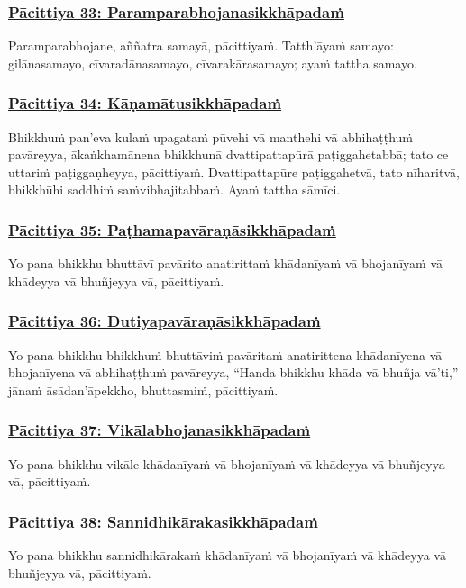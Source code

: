 \subsubsection*{\hyperref[exp33]{Pācittiya 33: Paramparabhojanasikkhāpadaṁ}}
\label{pac33}
Paramparabhojane, aññatra samayā, pācittiyaṁ. Tatth'āyaṁ samayo: gilānasamayo, cīvaradānasamayo, cīvarakārasamayo; ayaṁ tattha samayo.

\subsubsection*{\hyperref[exp34]{Pācittiya 34: Kāṇamātusikkhāpadaṁ}}
\label{pac34}
Bhikkhuṁ pan'eva kulaṁ upagataṁ pūvehi vā manthehi vā abhihaṭṭhuṁ pavāreyya, ākaṅkhamānena bhikkhunā dvattipattapūrā paṭiggahetabbā; tato ce uttariṁ paṭiggaṇheyya, pācittiyaṁ. Dvattipattapūre paṭiggahetvā, tato nīharitvā, bhikkhūhi saddhiṁ saṁvibhajitabbaṁ. Ayaṁ tattha sāmīci.

\subsubsection*{\hyperref[exp35]{Pācittiya 35: Paṭhamapavāraṇāsikkhāpadaṁ}}
\label{pac35}
Yo pana bhikkhu bhuttāvī pavārito anatirittaṁ khādanīyaṁ vā bhojanīyaṁ vā khādeyya vā bhuñjeyya vā, pācittiyaṁ.

\subsubsection*{\hyperref[exp36]{Pācittiya 36: Dutiyapavāraṇāsikkhāpadaṁ}}
\label{pac36}
Yo pana bhikkhu bhikkhuṁ bhuttāviṁ pavāritaṁ anatirittena khādanīyena vā bhojanīyena vā abhihaṭṭhuṁ pavāreyya, ``Handa bhikkhu khāda vā bhuñja vā'ti,'' jānaṁ āsādan'āpekkho, bhuttasmiṁ, pācittiyaṁ.

\subsubsection*{\hyperref[exp37]{Pācittiya 37: Vikālabhojanasikkhāpadaṁ}}
\label{pac37}
Yo pana bhikkhu vikāle khādanīyaṁ vā bhojanīyaṁ vā khādeyya vā bhuñjeyya vā, pācittiyaṁ.

\subsubsection*{\hyperref[exp38]{Pācittiya 38: Sannidhikārakasikkhāpadaṁ}}
\label{pac38}
Yo pana bhikkhu sannidhikārakaṁ khādanīyaṁ vā bhojanīyaṁ vā khādeyya vā bhuñjeyya vā, pācittiyaṁ.

